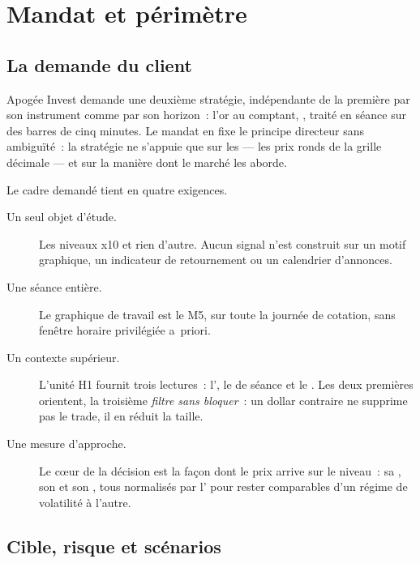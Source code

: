 \section{Mandat et périmètre}
\label{sec:x10_mandat}

\subsection{La demande du client}

Apogée Invest demande une deuxième stratégie, indépendante de la première par
son instrument comme par son horizon~: l'or au comptant, , traité
en séance sur des barres de cinq minutes. Le mandat en fixe le principe
directeur sans ambiguïté~: la stratégie ne s'appuie que sur les  --- les prix ronds de la grille décimale --- et sur la
manière dont le marché les aborde.

Le cadre demandé tient en quatre exigences.

\begin{description}
  \item[Un seul objet d'étude.] Les niveaux x10 et rien d'autre. Aucun signal
  n'est construit sur un motif graphique, un indicateur de retournement ou un
  calendrier d'annonces.
  \item[Une séance entière.] Le graphique de travail est le M5, sur toute la
  journée de cotation, sans fenêtre horaire privilégiée a~priori.
  \item[Un contexte supérieur.] L'unité H1 fournit trois lectures~:
  l', le  de séance et le . Les deux premières
  orientent, la troisième \emph{filtre sans bloquer}~: un dollar contraire ne
  supprime pas le trade, il en réduit la taille.
  \item[Une mesure d'approche.] Le c\oe{}ur de la décision est la façon dont le
  prix arrive sur le niveau~: sa , son  et son
  , tous normalisés par l' pour rester
  comparables d'un régime de volatilité à l'autre.
\end{description}

\subsection{Cible, risque et scénarios}

